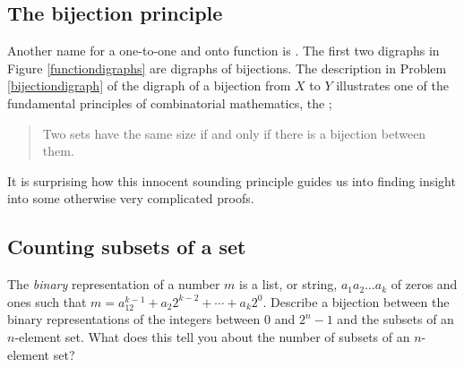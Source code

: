 \ep

\subsection{The bijection principle} Another name for a one-to-one
and onto function is .  The first two digraphs in Figure \ref{functiondigraphs} are
digraphs of bijections.  The description in Problem
\ref{bijectiondigraph} of the digraph of a bijection  from
$X$ to
$Y$ illustrates one of the fundamental principles of combinatorial
mathematics, the
;
\begin{quote}  Two sets have the same size if and only if
there is a bijection between them.
\end{quote} It is surprising how this innocent sounding
principle guides us into finding insight into some otherwise
very complicated proofs.

\subsection{Counting subsets of a set}
\bp 
\item The {\em binary} representation of a number $m$ is a list, or string,
$a_1a_2\ldots a_k$ of zeros and ones such that $m=a_12^{k-1} + a_2 2^{k-2}
+\cdots+ a_k 2^0.$  Describe a bijection between the binary representations of
the integers between 0 and $2^n-1$ and the subsets of an $n$-element set. 
What does this tell you about the number of subsets of an $n$-element
set?\label{SubsetsBinaryRepresentation}


